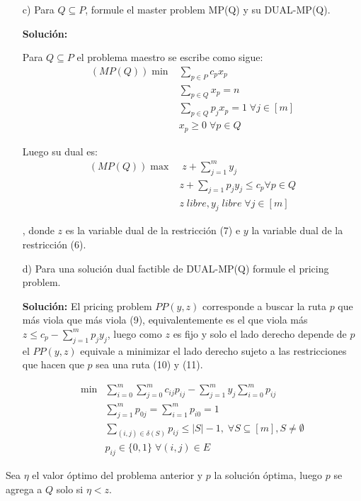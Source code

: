 \documentclass[10pt]{article}
\theoremstyle{plain}
\theoremstyle{definition}
\begin{document}
\begin{itemize}
\item[c)] Para $Q\subseteq P$, formule el master problem MP(Q) y su DUAL-MP(Q).

\textbf{Solución:}

Para $Q\subseteq P$ el problema maestro se escribe como sigue:
\begin{align}
    (MP(Q))\min & \sum_{p\in P}c_{p}x_{p}\nonumber\\
    & \sum_{p\in Q}x_{p}=n\\
    & \sum_{p\in Q}p_{j}x_{p} = 1 \; \forall j \in [m]\\
    & x_{p}\geq 0 \; \forall p \in Q\nonumber
\end{align}

Luego su dual es:
\begin{align}
    (MP(Q))\max & \;z+\sum_{j=1}^{m}y_{j}\nonumber\\
    & z+\sum_{j=1}p_{j}y_{j}\leq c_{p} \forall p \in Q\\
    & z \; libre, y_{j} \; libre \;\forall j \in [m]\nonumber
\end{align}

, donde $z$ es la variable dual de la restricción (7) e $y$ la variable dual de la restricción (6).

\item[d)] Para una solución dual factible de DUAL-MP(Q) formule el pricing problem.

\textbf{Solución:}
El pricing problem $PP(y,z)$ corresponde a buscar la ruta $p$ que más viola que más viola (9), equivalentemente es el que viola más $z\leq c_{p}-\sum_{j=1}^{m}p_{j}y_{j}$, luego como $z$ es fijo y solo el lado derecho depende de $p$ el $PP(y,z)$ equivale a minimizar el lado derecho sujeto a las restricciones que hacen que $p$ sea una ruta (10) y (11).

\begin{align}
    \min & \sum_{i=0}^{m}\sum_{j=0}^{m}c_{ij}p_{ij}-\sum_{j=1}^{m}y_{j}\sum_{i=0}^{m}p_{ij}\nonumber\\
    & \sum_{j=1}^{m}p_{0j}=\sum_{i=1}^{m}p_{i0}=1\\
    & \sum_{(i,j)\in \delta(S)}p_{ij}\leq |S|-1, \; \forall S\subseteq [m], S\neq\emptyset\\
    & p_{ij}\in\{0,1\} \;\forall (i,j) \in E\nonumber
\end{align}
\end{itemize}

Sea $\eta$ el valor óptimo del problema anterior y $p$ la solución óptima, luego $p$ se agrega a $Q$ solo si $\eta<z$. 
\end{document}

